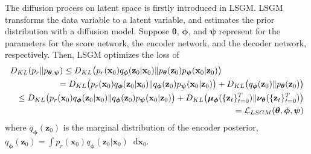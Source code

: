\documentclass{article}
\theoremstyle{definition}
\theoremstyle{remark}
\newcommand*\diff{\mathop{}\!\mathrm{d}}
\begin{document}
	The diffusion process on latent space is firstly introduced in LSGM. LSGM transforms the data variable to a latent variable, and estimates the prior distribution with a diffusion model. Suppose $\bm{\theta}$, $\bm{\phi}$, and $\bm{\psi}$ represent for the parameters for the score network, the encoder network, and the decoder network, respectively. Then, LSGM optimizes the loss of
	\begin{eqnarray*}
		\lefteqn{D_{KL}(p_{r}\Vert p_{\bm{\theta},\bm{\psi}})\le D_{KL}\big(p_{r}(\mathbf{x}_{0})q_{\bm{\phi}}(\mathbf{z}_{0}\vert\mathbf{x}_{0})\Vert p_{\bm{\theta}}(\mathbf{z}_{0})p_{\bm{\psi}}(\mathbf{x}_{0}\vert\mathbf{z}_{0})\big)}&\\
		&&= D_{KL}\big(p_{r}(\mathbf{x}_{0})q_{\bm{\phi}}(\mathbf{z}_{0}\vert\mathbf{x}_{0})\Vert q_{\bm{\phi}}(\mathbf{z}_{0})p_{\bm{\psi}}(\mathbf{x}_{0}\vert\mathbf{z}_{0})\big)+D_{KL}\big(q_{\bm{\phi}}(\mathbf{z}_{0})\Vert p_{\bm{\theta}}(\mathbf{z}_{0})\big)\\
		&&\le D_{KL}\big(p_{r}(\mathbf{x}_{0})q_{\bm{\phi}}(\mathbf{z}_{0}\vert\mathbf{x}_{0})\Vert q_{\bm{\phi}}(\mathbf{z}_{0})p_{\bm{\psi}}(\mathbf{x}_{0}\vert\mathbf{z}_{0})\big)+D_{KL}\big(\bm{\mu}_{\bm{\phi}}(\{\mathbf{z}_{t}\}_{t=0}^{T})\Vert \bm{\nu}_{\bm{\theta}}(\{\mathbf{z}_{t}\}_{t=0}^{T})\big)\\
		&&=\mathcal{L}_{LSGM}(\bm{\theta},\bm{\phi},\bm{\psi})
	\end{eqnarray*}
	where $q_{\bm{\phi}}(\mathbf{z}_{0})$ is the marginal distribution of the encoder posterior, $q_{\bm{\phi}}(\mathbf{z}_{0})=\int p_{r}(\mathbf{x}_{0})q_{\bm{\phi}}(\mathbf{z}_{0}\vert\mathbf{x}_{0})\diff\mathbf{x}_{0}$.
	
\end{document}
